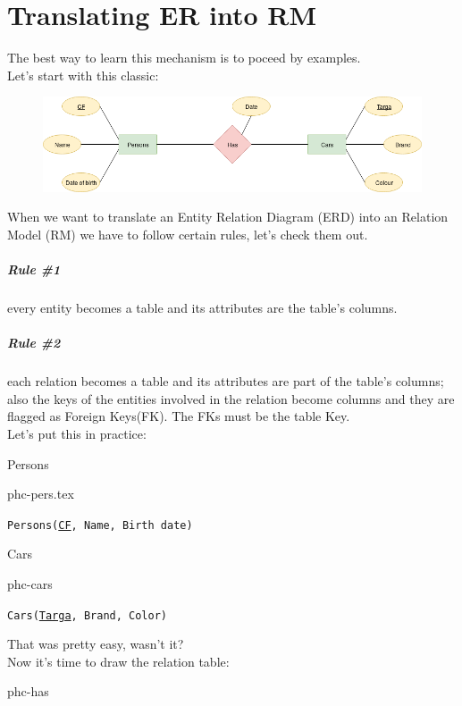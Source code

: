 \documentclass[class=book, crop=false, oneside]{standalone}
\begin{document}
\chapter*{Translating ER into RM}
The best way to learn this mechanism is to poceed by examples.\\
Let's start with this classic:

\begin{figure}[H]
	\centering
	\includegraphics[width=.9\textwidth,keepaspectratio]{diagram1.png}
	\caption{}
	\label{diagram1}
\end{figure}

When we want to translate an Entity Relation Diagram (ERD) into an Relation Model (RM) we have to follow certain rules, let's check them out.
\paragraph*{Rule \#1} every entity becomes a table and its attributes are the table's columns.
\paragraph*{Rule \#2} each relation becomes a table and its attributes are part of the table's columns; also the keys of the entities involved in the relation become columns and they are flagged as Foreign Keys(FK). The FKs must be the table Key.\\
Let's put this in practice:
\vskip 20pt

\begin{minipage}{0.45\textwidth}
	Persons
	\begin{table}[H]
		\centering
		{phc-pers.tex}
	\end{table}
	\texttt{Persons(\underline{CF}, Name, Birth date)}
\end{minipage}
\hspace{.1\textwidth}
\begin{minipage}{.45\textwidth}
	Cars
	\begin{table}[H]
		\centering
		{phc-cars}
	\end{table}
	\texttt{Cars(\underline{Targa}, Brand, Color)}
\end{minipage}
\vskip 20pt
That was pretty easy, wasn't it?\\
Now it's time to draw the relation table:
\vskip 20pt
\begin{minipage}{.7\textwidth}
\begin{table}[H]
	\centering
	{phc-has}
\end{table}
\end{minipage}


%
%
%
\end{document}
